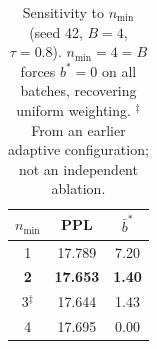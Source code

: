 \begin{table}[t]
\centering
\small
\begin{tabular}{@{}ccc@{}}
\toprule
$n_{\min}$ & \textbf{PPL} & $\bar{b}^*$ \\
\midrule
1 & 17.789 & 7.20 \\
\textbf{2} & \textbf{17.653} & \textbf{1.40} \\
3$^\ddagger$ & 17.644 & 1.43 \\
4 & 17.695 & 0.00 \\
\bottomrule
\end{tabular}
\caption{Sensitivity to $n_{\min}$ (seed 42, $B{=}4$, $\tau{=}0.8$).
$n_{\min} = 4 = B$ forces $b^* = 0$ on all batches, recovering uniform weighting.
$^\ddagger$From an earlier adaptive configuration; not an independent ablation.}
\label{tab:nmin}
\end{table}
